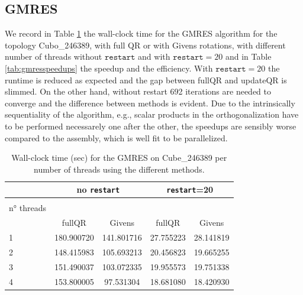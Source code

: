 \documentclass[hidelinks]{article}
\begin{document}
\subsection{GMRES}
We record in Table \ref{tab:gmrestimes} the wall-clock time for the GMRES algorithm for the topology Cubo\_246389, with full QR or with Givens rotations, with different number of threads without $\texttt{restart}$ and with $\texttt{restart}=20$ and in Table \ref{tab:gmresspeedups} the speedup and the efficiency. 
With $\texttt{restart}=20$ the runtime is reduced as expected and the gap between fullQR and updateQR is slimmed. On the other hand, without restart 692 iterations are needed to converge and the difference between methods is evident.
Due to the intrinsically sequentiality of the algorithm, e.g., scalar products in the orthogonalization have to be performed necessarely one after the other, the speedups are sensibly worse compared to the assembly, which is well fit to be parallelized.

\begin{table}[H]
    \centering
    \begin{tabular}{ l  c c c c }
        \toprule
        & \multicolumn{2}{c}{no \texttt{restart}} & \multicolumn{2}{c}{\texttt{restart}=20} \\ \midrule
        \begin{minipage}[t][.75cm][t]{1.75cm}
        \raggedleft method \\
        \raggedright n° threads \\
        \end{minipage} & fullQR & Givens 		& fullQR & Givens		\\ \midrule
        1  & 180.900720 & 141.801716 & 27.755223 & 28.141819   \\ 
        2  & 148.415983 & 105.693213 & 20.456823 & 19.665255   \\
        3  & 151.490037 & 103.072335 & 19.955573 & 19.751338  \\
        4  & 153.800005 & 97.531304  & 18.681080 & 18.420930   \\ \bottomrule

    \end{tabular}
    \caption{Wall-clock time (sec) for the GMRES on Cube\_246389 per number of threads using the different methods.}\label{tab:gmrestimes}
\end{table}
\end{document}
